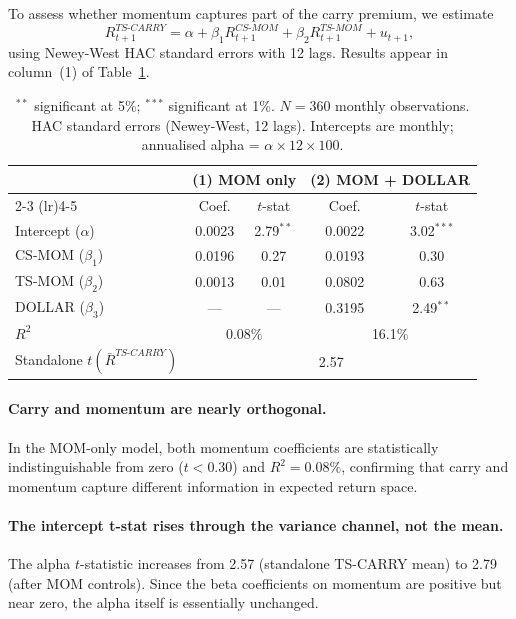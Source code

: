\documentclass[a4paper,12pt]{article}
\begin{document}
To assess whether momentum captures part of the carry premium, we estimate
\begin{equation}
    R^{TS\text{-}CARRY}_{t+1} = \alpha + \beta_1 R^{CS\text{-}MOM}_{t+1}
                                + \beta_2 R^{TS\text{-}MOM}_{t+1} + u_{t+1},
\end{equation}
using Newey-West HAC standard errors with 12 lags. Results appear in column~(1) of
Table~\ref{tab:reg}.

\begin{table}[H]
\centering
\caption{Regression of TS-CARRY on Momentum and Dollar Factors (HAC standard errors, 12 lags)}
\label{tab:reg}
\renewcommand{\arraystretch}{1.3}
\begin{tabular}{lcccc}
\toprule
 & \multicolumn{2}{c}{\textbf{(1) MOM only}} & \multicolumn{2}{c}{\textbf{(2) MOM + DOLLAR}} \\
\cmidrule(lr){2-3} \cmidrule(lr){4-5}
 & Coef. & $t$-stat & Coef. & $t$-stat \\
\midrule
Intercept ($\alpha$)     & 0.0023 & 2.79$^{**}$ & 0.0022 & 3.02$^{***}$ \\
CS-MOM ($\beta_1$)       & 0.0196 & 0.27        & 0.0193 & 0.30 \\
TS-MOM ($\beta_2$)       & 0.0013 & 0.01        & 0.0802 & 0.63 \\
DOLLAR ($\beta_3$)       & ---    & ---         & 0.3195 & 2.49$^{**}$ \\
\midrule
$R^2$                    & \multicolumn{2}{c}{0.08\%} & \multicolumn{2}{c}{16.1\%} \\
Standalone $t(\bar{R}^{TS\text{-}CARRY})$ & \multicolumn{4}{c}{2.57} \\
\bottomrule
\end{tabular}
\caption*{\footnotesize $^{**}$ significant at 5\%; $^{***}$ significant at 1\%.
$N = 360$ monthly observations. HAC standard errors (Newey-West, 12 lags).
Intercepts are monthly; annualised alpha = $\alpha \times 12 \times 100$.}
\end{table}

\paragraph{Carry and momentum are nearly orthogonal.}
In the MOM-only model, both momentum coefficients are statistically indistinguishable from
zero ($t < 0.30$) and $R^2 = 0.08\%$, confirming that carry and momentum capture different
information in expected return space.

\paragraph{The intercept t-stat rises through the variance channel, not the mean.}
The alpha $t$-statistic increases from 2.57 (standalone TS-CARRY mean) to 2.79 (after MOM
controls). Since the beta coefficients on momentum are positive but near zero, the alpha
itself is essentially unchanged.
\end{document}
